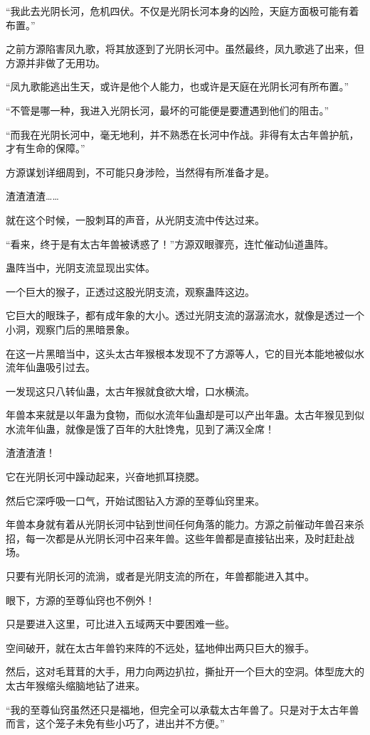 \begin{this_body}
“我此去光阴长河，危机四伏。不仅是光阴长河本身的凶险，天庭方面极可能有着布置。”

之前方源陷害凤九歌，将其放逐到了光阴长河中。虽然最终，凤九歌逃了出来，但方源并非做了无用功。

“凤九歌能逃出生天，或许是他个人能力，也或许是天庭在光阴长河有所布置。”

“不管是哪一种，我进入光阴长河，最坏的可能便是要遭遇到他们的阻击。”

“而我在光阴长河中，毫无地利，并不熟悉在长河中作战。非得有太古年兽护航，才有生命的保障。”

方源谋划详细周到，不可能只身涉险，当然得有所准备才是。

渣渣渣渣……

就在这个时候，一股刺耳的声音，从光阴支流中传达过来。

“看来，终于是有太古年兽被诱惑了！”方源双眼骤亮，连忙催动仙道蛊阵。

蛊阵当中，光阴支流显现出实体。

一个巨大的猴子，正透过这股光阴支流，观察蛊阵这边。

它巨大的眼珠子，都有成年象的大小。透过光阴支流的潺潺流水，就像是透过一个小洞，观察门后的黑暗景象。

在这一片黑暗当中，这头太古年猴根本发现不了方源等人，它的目光本能地被似水流年仙蛊吸引过去。

一发现这只八转仙蛊，太古年猴就食欲大增，口水横流。

年兽本来就是以年蛊为食物，而似水流年仙蛊却是可以产出年蛊。太古年猴见到似水流年仙蛊，就像是饿了百年的大肚馋鬼，见到了满汉全席！

渣渣渣渣！

它在光阴长河中躁动起来，兴奋地抓耳挠腮。

然后它深呼吸一口气，开始试图钻入方源的至尊仙窍里来。

年兽本身就有着从光阴长河中钻到世间任何角落的能力。方源之前催动年兽召来杀招，每一次都是从光阴长河中召来年兽。这些年兽都是直接钻出来，及时赶赴战场。

只要有光阴长河的流淌，或者是光阴支流的所在，年兽都能进入其中。

眼下，方源的至尊仙窍也不例外！

只是要进入这里，可比进入五域两天中要困难一些。

空间破开，就在太古年兽钓来阵的不远处，猛地伸出两只巨大的猴手。

然后，这对毛茸茸的大手，用力向两边扒拉，撕扯开一个巨大的空洞。体型庞大的太古年猴缩头缩脑地钻了进来。

“我的至尊仙窍虽然还只是福地，但完全可以承载太古年兽了。只是对于太古年兽而言，这个笼子未免有些小巧了，进出并不方便。”


\end{this_body}
